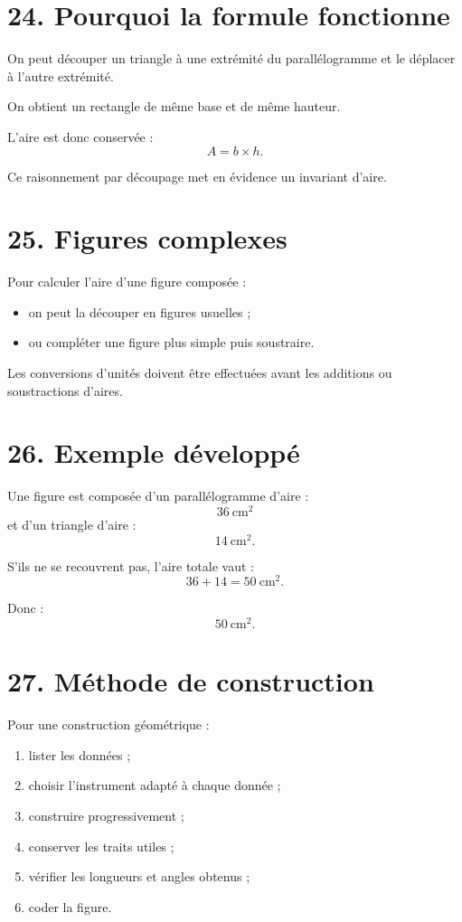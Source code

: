 \section{24. Pourquoi la formule fonctionne}

On peut découper un triangle à une extrémité du parallélogramme et le déplacer à l'autre extrémité.

On obtient un rectangle de même base et de même hauteur.

L'aire est donc conservée :
\[
A=b\times h.
\]

Ce raisonnement par découpage met en évidence un invariant d'aire.

\section{25. Figures complexes}

Pour calculer l'aire d'une figure composée :
\begin{itemize}
\item on peut la découper en figures usuelles ;
\item ou compléter une figure plus simple puis soustraire.
\end{itemize}

Les conversions d'unités doivent être effectuées avant les additions ou soustractions d'aires.

\section{26. Exemple développé}

Une figure est composée d'un parallélogramme d'aire :
\[
36\ \text{cm}^2
\]
et d'un triangle d'aire :
\[
14\ \text{cm}^2.
\]

S'ils ne se recouvrent pas, l'aire totale vaut :
\[
36+14=50\ \text{cm}^2.
\]

Donc :
\[
\boxed{50\ \text{cm}^2}.
\]

\section{27. Méthode de construction}

\begin{methode}
Pour une construction géométrique :
\begin{enumerate}
\item lister les données ;
\item choisir l'instrument adapté à chaque donnée ;
\item construire progressivement ;
\item conserver les traits utiles ;
\item vérifier les longueurs et angles obtenus ;
\item coder la figure.
\end{enumerate}
\end{methode}

